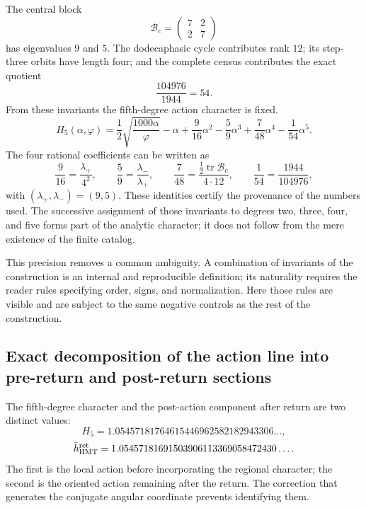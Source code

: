 
The central block
\[
\mathcal B_c=\begin{pmatrix}7&2\\2&7\end{pmatrix}
\]
has eigenvalues \(9\) and \(5\). The dodecaphasic cycle contributes rank
\(12\); its step-three orbits have length four; and the complete census
contributes the exact quotient
\[
\frac{104976}{1944}=54.
\]
From these invariants the fifth-degree action character is fixed.
\[
\boxed{
H_5(\alpha,\varphi)
=\frac12\sqrt{\frac{1000\alpha}{\varphi}}-\alpha
+\frac9{16}\alpha^2-\frac59\alpha^3
+\frac7{48}\alpha^4-\frac1{54}\alpha^5.}
\]
The four rational coefficients can be written as
\[
\frac9{16}=\frac{\lambda_+}{4^2},
\qquad
\frac59=\frac{\lambda_-}{\lambda_+},
\qquad
\frac7{48}=\frac{\tfrac12\operatorname{tr}\mathcal B_c}{4\cdot12},
\qquad
\frac1{54}=\frac{1944}{104976},
\]
with \((\lambda_+,\lambda_-)=(9,5)\). These identities certify the
provenance of the numbers used. The successive assignment of those
invariants to degrees two, three, four, and five forms part of the analytic
character; it does not follow from the mere existence of the finite catalog.

This precision removes a common ambiguity. A combination of
invariants of the construction is an internal and reproducible definition; its
naturality requires the reader rules specifying order, signs, and
normalization. Here those rules are visible and are subject to the same
negative controls as the rest of the construction.

\subsection{Exact decomposition of the action line into pre-return and post-return sections}
\label{sec:s102:c38:3:3}


The fifth-degree character and the post-action component after return
are two distinct values:
\[
H_5
=1.05457181764615446962582182943306\ldots,
\]
\[
\bar h_{\rm HMT}^{\rm ret}
=1.05457181691503906113369058472430\ldots.
\]
The first is the local action before incorporating the regional character; the
second is the oriented action remaining after the return. The correction
that generates the conjugate angular coordinate prevents identifying them.

